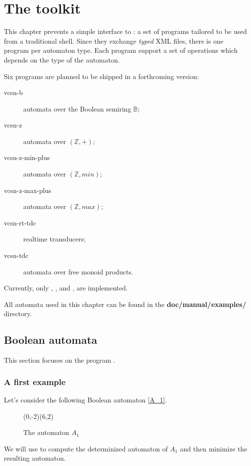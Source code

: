 \chapter{The \Vauc toolkit}

This chapter prevents a simple interface to \Vauc: a set of programs
tailored to be used from a traditional shell.  Since they exchange
\emph{typed} XML files, there is one program per automaton type.  Each
program support a set of operations which depends on the type of the
automaton.

Six programs are planned to be shipped in a forthcoming version:
\begin{description}
\item [vcsn-b] automata over the Boolean semiring $\mathbb{B}$;
\item [vcsn-z] automata over $(\mathbb{Z},+)$;
\item [vcsn-z-min-plus] automata over $(\mathbb{Z},min)$;
\item [vcsn-z-max-plus] automata over $(\mathbb{Z},max)$;
\item [vcsn-rt-tdc] realtime transducers;
\item [vcsn-tdc] automata over free monoid products.
\end{description}

Currently, only , , and
, are implemented.

All automata used in this chapter can be found in the
\textbf{doc/manual/examples/} directory.

\newpage

\section{Boolean automata}

This section focuses on the program .

\subsection{A first example}

Let's consider the following Boolean automaton \autoref{A_1}.
\begin{figure}[ht] \centering
  \begin{VCPicture}{(0,-2)(6,2)}
      
     
     
       
  \end{VCPicture}
  \caption{The automaton $A_1$}
  \label{A_1}
\end{figure}
We will use \Vauc to compute the determinized automaton of $A_1$ and
then minimize the resulting automaton.

